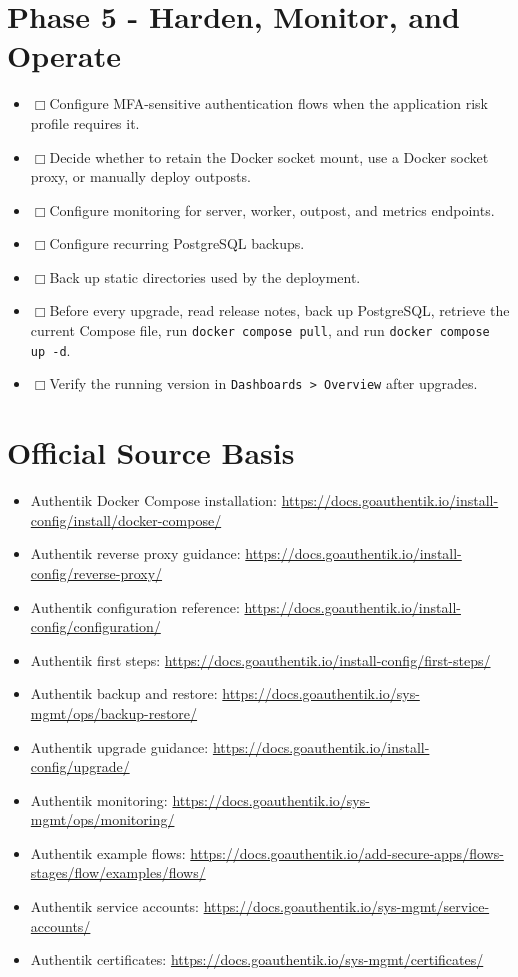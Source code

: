 \documentclass[11pt]{article}
\newcommand{\checkbox}{$\Box$\hspace{0.4em}}
\newcommand{\sourcebasis}{\section*{Official Source Basis}\begin{itemize}
\item Authentik Docker Compose installation: \url{https://docs.goauthentik.io/install-config/install/docker-compose/}
\item Authentik reverse proxy guidance: \url{https://docs.goauthentik.io/install-config/reverse-proxy/}
\item Authentik configuration reference: \url{https://docs.goauthentik.io/install-config/configuration/}
\item Authentik first steps: \url{https://docs.goauthentik.io/install-config/first-steps/}
\item Authentik backup and restore: \url{https://docs.goauthentik.io/sys-mgmt/ops/backup-restore/}
\item Authentik upgrade guidance: \url{https://docs.goauthentik.io/install-config/upgrade/}
\item Authentik monitoring: \url{https://docs.goauthentik.io/sys-mgmt/ops/monitoring/}
\item Authentik example flows: \url{https://docs.goauthentik.io/add-secure-apps/flows-stages/flow/examples/flows/}
\item Authentik service accounts: \url{https://docs.goauthentik.io/sys-mgmt/service-accounts/}
\item Authentik certificates: \url{https://docs.goauthentik.io/sys-mgmt/certificates/}
\end{itemize}}
\begin{document}
\section*{Phase 5 - Harden, Monitor, and Operate}
\begin{itemize}
\item \checkbox Configure MFA-sensitive authentication flows when the application risk profile requires it.
\item \checkbox Decide whether to retain the Docker socket mount, use a Docker socket proxy, or manually deploy outposts.
\item \checkbox Configure monitoring for server, worker, outpost, and metrics endpoints.
\item \checkbox Configure recurring PostgreSQL backups.
\item \checkbox Back up static directories used by the deployment.
\item \checkbox Before every upgrade, read release notes, back up PostgreSQL, retrieve the current Compose file, run \texttt{docker compose pull}, and run \texttt{docker compose up -d}.
\item \checkbox Verify the running version in \texttt{Dashboards > Overview} after upgrades.
\end{itemize}

\sourcebasis
\end{document}
